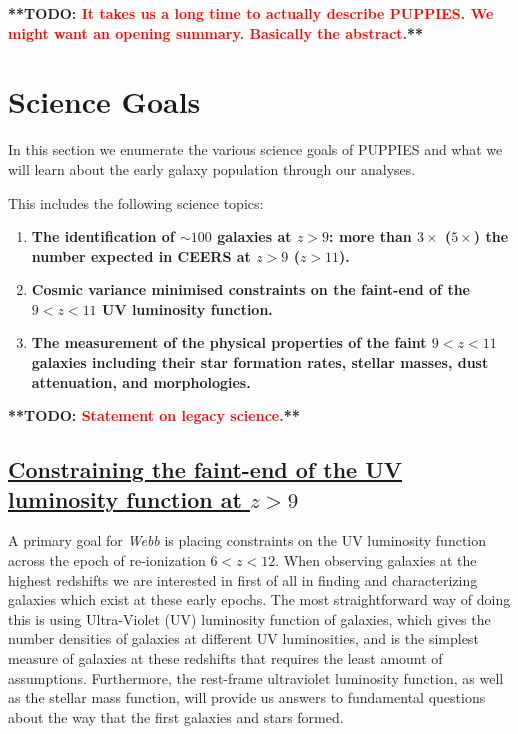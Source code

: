 \documentclass[12pt]{article}
\newcommand{\todo}[1]{\textbf{**TODO: \textcolor{red}{#1}**}}
\begin{document}
\todo{It takes us a long time to actually describe PUPPIES. We might want an opening summary. Basically the abstract.}

\section{Science Goals}

\noindent In this section we enumerate the various science goals of PUPPIES and what we will learn about the early galaxy population through our analyses.

This includes the following science topics:

\begin{enumerate}
\item \textbf{The identification of $\sim 100$ galaxies at $z>9$: more than $3\times$ ($5\times$) the number expected in CEERS at $z>9$ ($z>11$).}
\item \textbf{Cosmic variance minimised constraints on the faint-end of the $9<z<11$ UV luminosity function.} 
\item \textbf{The measurement of the physical properties of the faint $9<z<11$ galaxies including their star formation rates, stellar masses, dust attenuation, and morphologies.}
\end{enumerate}

\todo{Statement on legacy science.}

\subsection{\bf \underline{Constraining the faint-end of the UV luminosity function at $z > 9$}}\label{sec:UVLF}

A primary goal for \emph{Webb} is placing constraints on the UV luminosity function across the epoch of re-ionization $6<z<12$. When observing galaxies at the highest redshifts we are interested in first of all in finding and characterizing galaxies which exist at these early epochs.  The most straightforward way of doing this is using Ultra-Violet (UV) luminosity function of galaxies, which gives the number densities of galaxies at different UV luminosities, and is the simplest measure of galaxies at these redshifts that requires the least amount of assumptions.  Furthermore, the rest-frame ultraviolet luminosity function, as well as the stellar mass function, will provide us answers to fundamental questions about the way that the first galaxies and stars formed.
\end{document}
